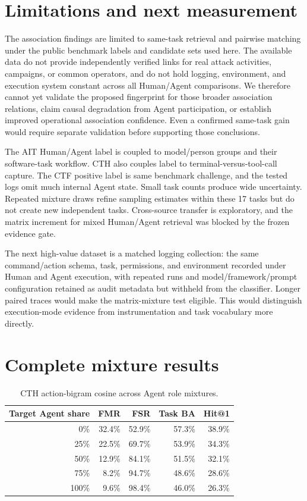 \documentclass[11pt]{article}
\begin{document}
\section{Limitations and next measurement}
The association findings are limited to same-task retrieval and pairwise matching under the public benchmark labels and candidate sets used here. The available data do not provide independently verified links for real attack activities, campaigns, or common operators, and do not hold logging, environment, and execution system constant across all Human/Agent comparisons. We therefore cannot yet validate the proposed fingerprint for those broader association relations, claim causal degradation from Agent participation, or establish improved operational association confidence. Even a confirmed same-task gain would require separate validation before supporting those conclusions.

The AIT Human/Agent label is coupled to model/person groups and their software-task workflow. CTH also couples label to terminal-versus-tool-call capture. The CTF positive label is same benchmark challenge, and the tested logs omit much internal Agent state. Small task counts produce wide uncertainty. Repeated mixture draws refine sampling estimates within these 17 tasks but do not create new independent tasks. Cross-source transfer is exploratory, and the matrix increment for mixed Human/Agent retrieval was blocked by the frozen evidence gate.

The next high-value dataset is a matched logging collection: the same command/action schema, task, permissions, and environment recorded under Human and Agent execution, with repeated runs and model/framework/prompt configuration retained as audit metadata but withheld from the classifier. Longer paired traces would make the matrix-mixture test eligible. This would distinguish execution-mode evidence from instrumentation and task vocabulary more directly.

\appendix
\section{Complete mixture results}
\begin{table}[ht]
\centering
\small
\caption{CTH action-bigram cosine across Agent role mixtures.}
\begin{tabular}{@{}r r r r r@{}}
\toprule
Target Agent share & FMR & FSR & Task BA & Hit@1 \\
\midrule
0\% & 32.4\% & 52.9\% & 57.3\% & 38.9\% \\
25\% & 22.5\% & 69.7\% & 53.9\% & 34.3\% \\
50\% & 12.9\% & 84.1\% & 51.5\% & 32.1\% \\
75\% & 8.2\% & 94.7\% & 48.6\% & 28.6\% \\
100\% & 9.6\% & 98.4\% & 46.0\% & 26.3\% \\
\bottomrule
\end{tabular}
\end{table}
\end{document}
